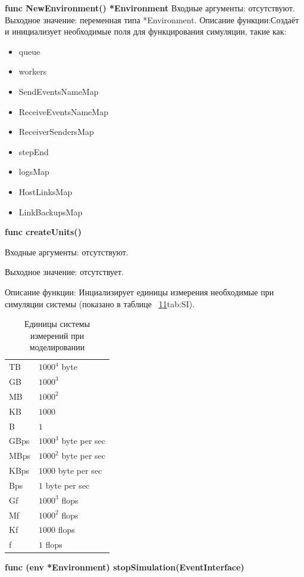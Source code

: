 \textbf{func NewEnvironment() *Environment}
Входные аргументы: отсутствуют.
Выходное значение: переменная типа *Environment.
Описание функции:Создаёт и инициализует необходимые поля для функцирования симуляции, такие как:
\begin{itemize}
	\item 		queue           
	\item 		workers        
	\item 		SendEventsNameMap 
	\item 		ReceiveEventsNameMap
	\item 		ReceiverSendersMap
	\item 		stepEnd
	\item 		logsMap
	\item 		HostLinksMap
	\item 		LinkBackupsMap
\end{itemize}

\textbf{func createUnits()}

Входные аргументы: отсутствуют.

Выходное значение: отсутствует.

Описание функции: Инциализирует единицы измерения необходимые при симуляции системы (показано в таблице ~\ref{tab:SI}\ref{tab:SI}{tab:SI}).
\begin{table}[]
	\centering
	\caption{Единицы системы измерений при моделировании}
	\label{tab:SI}
	\begin{tabularx}{\textwidth}{|X|X|}
		TB   & $1000^4$ byte         \\
		GB   & $1000^3$              \\
		MB   & $1000^2$              \\
		KB   & $1000$                \\
		B    & $1$                   \\
		GBps & $1000^3$ byte per sec \\
		MBps & $1000^2$ byte per sec \\
		KBps & $1000$ byte per sec   \\
		Bps  & $1$ byte per sec      \\
		Gf   & $1000^3$ flops        \\
		Mf   & $1000^2$ flops        \\
		Kf   & $1000$ flops          \\
		f    & $1$ flops            
	\end{tabularx}
\end{table}

\textbf{func (env *Environment) stopSimulation(EventInterface)}


